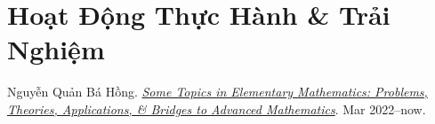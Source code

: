 \documentclass{article}
\numberwithin{equation}{section}
\begin{document}
\section*{Hoạt Động Thực Hành \& Trải Nghiệm}


\begin{thebibliography}{99}
	 Nguyễn Quản Bá Hồng. \href{https://github.com/NQBH/hobby/blob/master/elementary_mathematics/NQBH_elementary_mathematics.pdf}{\textit{Some Topics in Elementary Mathematics: Problems, Theories, Applications, \& Bridges to Advanced Mathematics}}. Mar 2022--now.
\end{thebibliography}


\printbibliography[heading=bibintoc]
	
\end{document}
